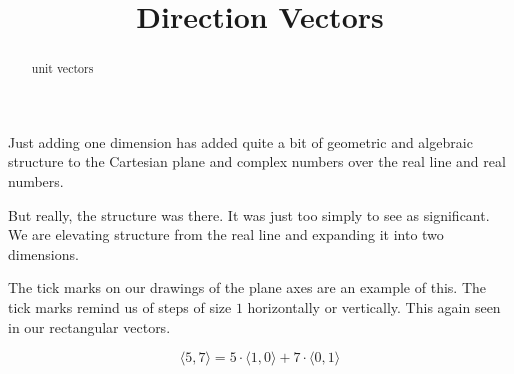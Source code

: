 \documentclass{ximera}
\title{Direction Vectors}
\begin{document}
\begin{abstract}
unit vectors
\end{abstract}
\maketitle





Just adding one dimension has added quite a bit of geometric and algebraic structure to the Cartesian plane and complex numbers over the real line and real numbers.


But really, the structure was there.  It was just too simply to see as significant.  We are elevating structure from the real line and expanding it into two dimensions.



The tick marks on our drawings of the plane axes are an example of this. The tick marks remind us of steps of size $1$ horizontally or vertically.  This again seen in our rectangular vectors.


\[ \langle 5, 7 \rangle = 5 \cdot  \langle 1, 0 \rangle + 7 \cdot \langle 0, 1 \rangle  \]
\end{document}
